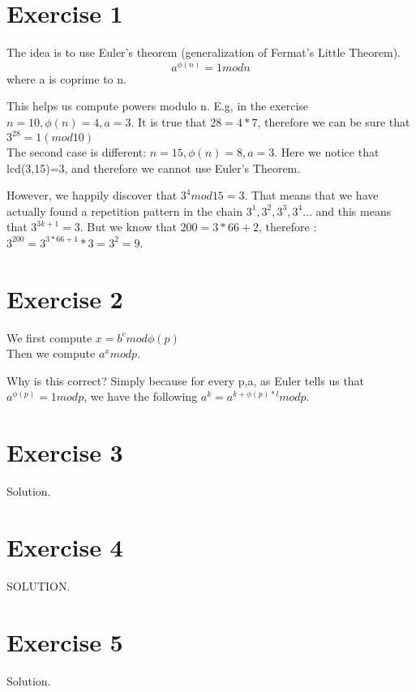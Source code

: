 \section*{Exercise 1}
The idea is to use Euler's theorem (generalization of Fermat's Little Theorem).
\[ a^{\phi(n)} = 1 mod n \] where a is coprime to n. 

This helps us compute powers modulo n. E.g, in the exercise $n=10, \phi(n) =4, a=3$. It is true that $28=4*7$, therefore we can be sure that $3^{28}=1 (mod10)$
\\

The second case is different: $n=15, \phi(n)=8, a=3$. Here we notice that lcd(3,15)=3, and therefore we cannot use Euler's Theorem.

However, we happily discover that $3^4 mod 15 = 3$. That means that we have actually found a repetition pattern in the chain 
$3^1,3^2,3^3,3^4\ldots $ and this means that $3^{3k+1}=3$. But we know that $200= 3*66+2$, therefore : $3^{200}=3^{3*66+1}*3=3^2=9$.

\section*{Exercise 2}

We first compute $x=b^c mod \phi(p)$ \\
Then we compute  $a^x mod p$. 

Why is this correct? Simply because for every p,a, as Euler tells us that$a^{\phi(p)}=1 mod p$, we have the following $ a^k = a^{k+\phi(p)*l} mod p $.


\section*{Exercise 3}
Solution.
\section*{Exercise 4}
SOLUTION.
\section*{Exercise 5}
Solution.


